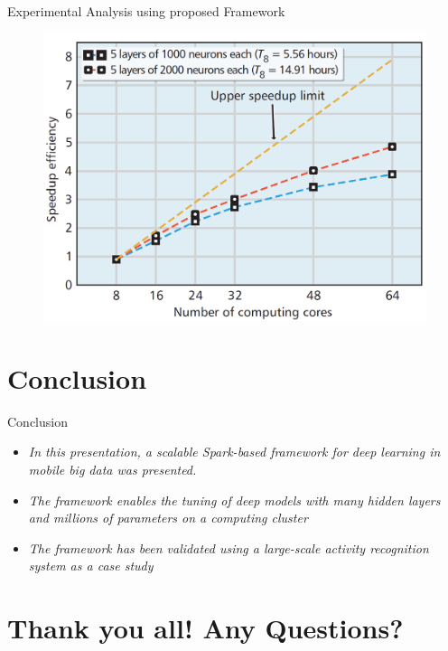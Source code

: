 \documentclass[newPxFont]{beamer}
\begin{document}
\begin{frame}[allowframebreaks]{Experimental Analysis using proposed Framework}
    
   	\framebreak 
    
    \begin{figure}
    	\centering
        \includegraphics[width=.70\linewidth]{resources/analysis3.png}
        \label{fig:computingCore}
    \end{figure}
    
\end{frame}

\section{Conclusion}
\begin{frame}{Conclusion}
  \begin{itemize}
      \item{\textit{In this presentation, a scalable Spark-based framework for deep learning in mobile big data was presented.}}
      \item{\textit{The framework enables the tuning of deep models with many hidden layers and millions of parameters on a computing cluster}}
      \item{\textit{The framework has been validated using a large-scale activity recognition system as a case study}}
  \end{itemize}
\end{frame}

\section{Thank you all!  Any Questions?}
\end{document}
